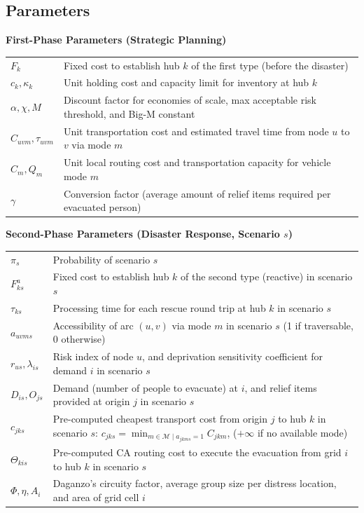 \documentclass{llncs}
\begin{document}
\subsection{Parameters}

\noindent \textbf{First-Phase Parameters (Strategic Planning)} \\
\begin{tabular}{l p{}}
$F_k$ & Fixed cost to establish hub $k$ of the first type (before the disaster) \\
$c_k, \kappa_k$ & Unit holding cost and capacity limit for inventory at hub $k$ \\
$\alpha, \chi, M$ & Discount factor for economies of scale, max acceptable risk threshold, and Big-M constant \\
$C_{uvm}, \tau_{uvm}$ & Unit transportation cost and estimated travel time from node $u$ to $v$ via mode $m$ \\
$C_m, Q_m$ & Unit local routing cost and transportation capacity for vehicle mode $m$ \\
$\gamma$ & Conversion factor (average amount of relief items required per evacuated person) \\
\end{tabular}

\noindent \textbf{Second-Phase Parameters (Disaster Response, Scenario $s$)} \\
\begin{tabular}{l p{}}
$\pi_s$ & Probability of scenario $s$ \\
$F_{ks}^{a}$ & Fixed cost to establish hub $k$ of the second type (reactive) in scenario $s$ \\
$\tau_{ks}$ & Processing time for each rescue round trip at hub $k$ in scenario $s$ \\
$a_{uvms}$ & Accessibility of arc $(u,v)$ via mode $m$ in scenario $s$ (1 if traversable, 0 otherwise) \\
$r_{us}, \lambda_{is}$ & Risk index of node $u$, and deprivation sensitivity coefficient for demand $i$ in scenario $s$ \\
$D_{is}, O_{js}$ & Demand (number of people to evacuate) at $i$, and relief items provided at origin $j$ in scenario $s$ \\
$c_{jks}$             & Pre-computed cheapest transport cost from origin $j$ to hub $k$ in scenario $s$:
                        $c_{jks} = \min_{m \in \mathcal{M} \mid a_{jkms}=1} C_{jkm}$, ($+\infty$ if no available mode) \\
$\Theta_{kis}$ & Pre-computed CA routing cost to execute the evacuation from grid $i$ to hub $k$ in scenario $s$ \\
$\Phi, \eta, A_i$ & Daganzo's circuity factor, average group size per distress location, and area of grid cell $i$ \\
\end{tabular}
\end{document}
